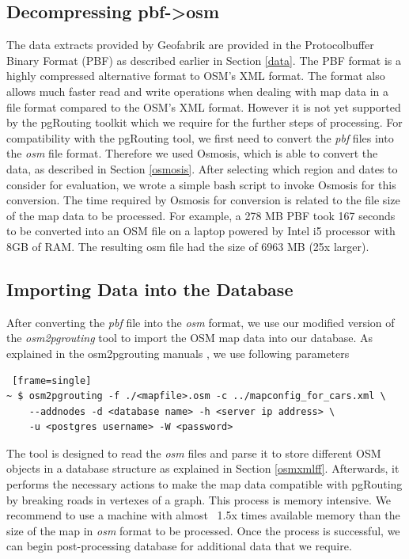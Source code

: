 \subsection{Decompressing pbf->osm}
The data extracts provided by Geofabrik are provided in the Protocolbuffer Binary Format (PBF) \cite{osmpbf} as described earlier in Section \ref{data}. The PBF format is a highly compressed alternative format to OSM's XML format. The format also allows much faster read and write operations when dealing with map data in a file format compared to the OSM's XML format. However it is not yet supported by the pgRouting toolkit which we require for the further steps of processing. For compatibility with the pgRouting tool, we first need to convert the \textit{pbf} files into the \textit{osm} file format. Therefore we used Osmosis, which is able to convert the data, as described in Section \ref{osmosis}. After selecting which region and dates to consider for evaluation, we wrote a simple bash script to invoke Osmosis for this conversion. The time required by Osmosis for conversion  is related to the file size of the map data to be processed. For example, a 278 MB PBF took 167 seconds to be converted into an OSM file on a laptop powered by Intel i5 processor with 8GB of RAM. The resulting osm file had the size of 6963 MB (25x larger).
\subsection{Importing Data into the Database}
After converting the \textit{pbf} file into the \textit{osm} format, we use our modified version of the \textit{osm2pgrouting} tool to import the OSM map data into our database. As explained in the osm2pgrouting manuals \cite{osm2pgrouting}, we use following parameters 
\begin{lstlisting} [frame=single]
~ $ osm2pgrouting -f ./<mapfile>.osm -c ../mapconfig_for_cars.xml \
    --addnodes -d <database name> -h <server ip address> \
    -u <postgres username> -W <password>
\end{lstlisting}

The tool is designed to read the \textit{osm} files and parse it to store different OSM objects in a database structure as explained in Section \ref{osmxmlff}. Afterwards, it performs the necessary actions to make the map data compatible with pgRouting by breaking roads in vertexes of a graph. This process is memory intensive. We recommend to use a machine with almost ~1.5x times available memory than the size of the map in \textit{osm} format to be processed. Once the process is successful, we can begin post-processing database for additional data that we require. 
